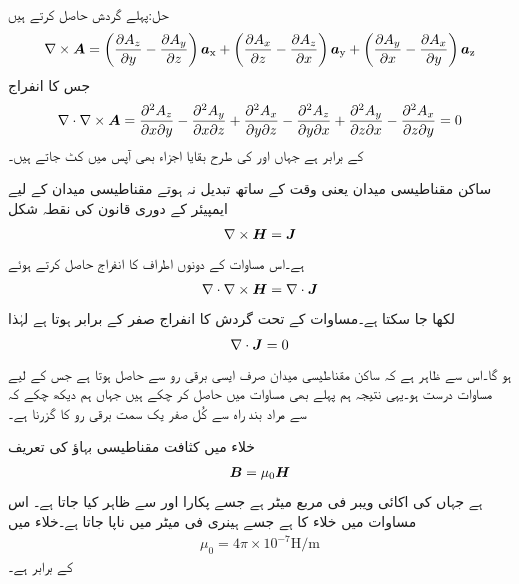 حل:پہلے گردش حاصل کرتے ہیں
\begin{align*}
\nabla \times {\ensuremath{{\boldsymbol{A}}}}=\left(\frac{\partial A_z}{\partial y}-\frac{\partial A_y}{\partial z} \right){\boldsymbol{a}}_{\textup{x}}+\left(\frac{\partial A_x}{\partial z}-\frac{\partial A_z}{\partial x} \right){\boldsymbol{a}}_{\textup{y}}+\left(\frac{\partial A_y}{\partial x}-\frac{\partial A_x}{\partial y} \right){\boldsymbol{a}}_{\textup{z}}
\end{align*}
جس کا انفراج
\begin{align*}
\nabla \cdot \nabla \times {\ensuremath{{\boldsymbol{A}}}}=\frac{\partial^2 A_z}{\partial x \partial y}-\frac{\partial^2 A_y}{\partial x \partial z}+\frac{\partial^2 A_x}{\partial y \partial z}-\frac{\partial^2 A_z}{\partial y \partial x}+\frac{\partial^2 A_y}{\partial z \partial x}-\frac{\partial^2 A_x}{\partial z \partial y}=0
\end{align*}
کے برابر ہے جہاں  اور  کی طرح بقایا اجزاء بھی آپس میں کٹ جاتے ہیں۔

ساکن مقناطیسی میدان یعنی وقت کے ساتھ تبدیل نہ ہوتے مقناطیسی میدان کے لیے ایمپیئر کے دوری قانون کی نقطہ شکل
\begin{align*}
\nabla \times {\ensuremath{{\boldsymbol{H}}}}={{\boldsymbol{J}}}
\end{align*}
ہے۔اس مساوات کے دونوں اطراف کا انفراج حاصل کرتے ہوئے
\begin{align*}
\nabla \cdot \nabla \times {\ensuremath{{\boldsymbol{H}}}}=\nabla \cdot {\ensuremath{{\boldsymbol{J}}}}
\end{align*}
لکھا جا سکتا ہے۔مساوات  کے تحت گردش کا انفراج صفر کے برابر ہوتا ہے لہٰذا
\begin{align}\label{مساوات_مقناطیسی_استمراری_مساوات}
\nabla \cdot {\ensuremath{{\boldsymbol{J}}}}=0
\end{align}
ہو گا۔اس سے ظاہر ہے کہ ساکن مقناطیسی میدان صرف ایسی برقی رو سے حاصل ہوتا ہے  جس کے لیے مساوات  درست ہو۔یہی نتیجہ ہم پہلے بھی مساوات  میں حاصل کر چکے ہیں جہاں ہم دیکھ چکے کہ  سے مراد بند راہ سے کُل صفر یک سمت برقی رو کا گزرنا ہے۔

خلاء میں کثافت مقناطیسی بہاؤ  کی تعریف
\begin{align}\label{مساوات_مقناطیسی_میدان_بالمقابل_شدت}
{\ensuremath{{\boldsymbol{B}}}}=\mu_0 {{\boldsymbol{H}}}
\end{align}
ہے جہاں  کی اکائی ویبر فی مربع میٹر  ہے جسے  پکارا اور  سے ظاہر کیا جاتا ہے۔ اس مساوات میں  خلاء کا  ہے جسے ہینری فی میٹر  میں ناپا جاتا ہے۔خلاء میں
\begin{align}
\mu_0=4\pi \times 10^{-7} \si{\henry \per \meter}
\end{align}
کے برابر ہے۔

